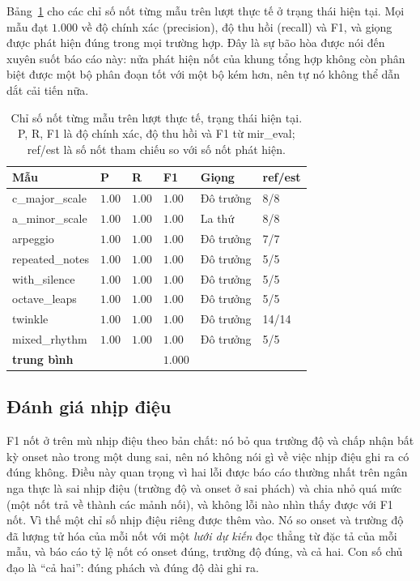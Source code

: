 \documentclass[12pt,a4paper]{article}
\begin{document}
Bảng~\ref{tab:note-perfixture} cho các chỉ số nốt từng mẫu trên lượt thực tế ở trạng
thái hiện tại. Mọi mẫu đạt $1.000$ về độ chính xác (precision), độ thu hồi (recall)
và F1, và giọng được phát hiện đúng trong mọi trường hợp. Đây là sự bão hòa được nói
đến xuyên suốt báo cáo này: nửa phát hiện nốt của khung tổng hợp không còn phân biệt
được một bộ phân đoạn tốt với một bộ kém hơn, nên tự nó không thể dẫn dắt cải tiến
nữa.

\begin{table}[H]
\centering
\caption{Chỉ số nốt từng mẫu trên lượt thực tế, trạng thái hiện tại. P, R, F1 là
độ chính xác, độ thu hồi và F1 từ mir\_eval; ref/est là số nốt tham chiếu so với số
nốt phát hiện.}
\label{tab:note-perfixture}
\begin{tabular}{l l l l l l}
\toprule
\textbf{Mẫu} & \textbf{P} & \textbf{R} & \textbf{F1} & \textbf{Giọng} &
\textbf{ref/est} \\
\midrule
c\_major\_scale  & $1.00$ & $1.00$ & $1.00$ & Đô trưởng & 8/8 \\
a\_minor\_scale  & $1.00$ & $1.00$ & $1.00$ & La thứ & 8/8 \\
arpeggio         & $1.00$ & $1.00$ & $1.00$ & Đô trưởng & 7/7 \\
repeated\_notes  & $1.00$ & $1.00$ & $1.00$ & Đô trưởng & 5/5 \\
with\_silence    & $1.00$ & $1.00$ & $1.00$ & Đô trưởng & 5/5 \\
octave\_leaps    & $1.00$ & $1.00$ & $1.00$ & Đô trưởng & 5/5 \\
twinkle          & $1.00$ & $1.00$ & $1.00$ & Đô trưởng & 14/14 \\
mixed\_rhythm    & $1.00$ & $1.00$ & $1.00$ & Đô trưởng & 5/5 \\
\midrule
\textbf{trung bình}    &        &        & $1.000$ &        & \\
\bottomrule
\end{tabular}
\end{table}

\subsection{Đánh giá nhịp điệu}
\label{sec:results-rhythm}

F1 nốt ở trên mù nhịp điệu theo bản chất: nó bỏ qua trường độ và chấp nhận bất kỳ
onset nào trong một dung sai, nên nó không nói gì về việc nhịp điệu ghi ra có đúng
không. Điều này quan trọng vì hai lỗi được báo cáo thường nhất trên ngân nga thực là
sai nhịp điệu (trường độ và onset ở sai phách) và chia nhỏ quá mức (một nốt trả về
thành các mảnh nối), và không lỗi nào nhìn thấy được với F1 nốt. Vì thế một chỉ số
nhịp điệu riêng được thêm vào. Nó so onset và trường độ đã lượng tử hóa của mỗi nốt
với một \emph{lưới dự kiến} đọc thẳng từ đặc tả của mỗi mẫu, và báo cáo tỷ lệ nốt có
onset đúng, trường độ đúng, và cả hai. Con số chủ đạo là ``cả hai'': đúng phách và
đúng độ dài ghi ra.
\end{document}
